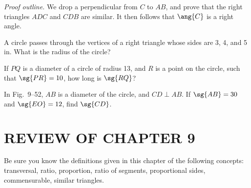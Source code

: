 \documentclass[11pt]{book}
\theoremstyle{bkplain}
\theoremstyle{XIplainnote}
\theoremstyle{bkplain}
\theoremstyle{bkplain}
\begin{document}
\noindent\emph{Proof outline.} We drop a perpendicular from $C$ to $AB$, and
prove that the right triangles $ADC$ and $CDB$ are similar. It then follows that
$\ang{C}$ is a right angle.

\begin{steps}
\end{steps}

\begin{exercisecols}
\begin{exlist}
\item A circle passes through the vertices of a right triangle whose sides are 3,
      4, and 5 in. What is the radius of the circle?
\item If $PQ$ is a diameter of a circle of radius 13, and $R$ is a point on the
      circle, such that $\sg{PR} = 10$, how long is $\sg{RQ}$?
\item In Fig.~9--52, $AB$ is a diameter of the circle, and $CD \perp AB$. If
      $\sg{AB} = 30$ and $\sg{EO} = 12$, find $\sg{CD}$.
\exfig{\FIGIXFIFTYTWO}
\end{exlist}
\end{exercisecols}

\section*{REVIEW OF CHAPTER 9}

Be sure you know the definitions given in this chapter of the following concepts:
transversal, ratio, proportion, ratio of segments, proportional sides,
commensurable, similar triangles.
\end{document}
